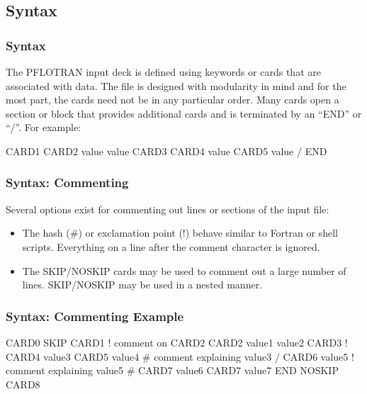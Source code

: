 \subsection{Syntax}

\begin{frame}\frametitle{Syntax}

The PFLOTRAN input deck is defined using keywords or cards that are associated with data.  The file is designed with modularity in mind and for the most part, the cards need not be in any particular order.  Many cards open a section or block that provides additional cards and is terminated by an ``END'' or ``/''.  For example:

\begin{semiverbatim}
CARD1
  CARD2 value value
  CARD3
    CARD4 value
    CARD5 value
  /
END
\end{semiverbatim}

\end{frame}

\begin{frame}[fragile]\frametitle{Syntax: Commenting}
Several options exist for commenting out lines or sections of the input file:
\begin{itemize}
\item The hash (\#) or exclamation point (!) behave similar to Fortran or shell scripts.  Everything on a line after the comment character is ignored.
\item The SKIP/NOSKIP cards may be used to comment out a large number of lines.  SKIP/NOSKIP may be used in a nested manner.
\end{itemize}

\end{frame}

\begin{frame}[containsverbatim]\frametitle{Syntax: Commenting Example}

\begin{semiverbatim}
CARD0
SKIP
CARD1
  ! comment on CARD2
  CARD2 value1 value2
  CARD3
  !  CARD4 value3
    CARD5 value4 # comment explaining value3
  /
  CARD6 value5 ! comment explaining value5
#  CARD7 value6
  CARD7 value7
END
NOSKIP
CARD8
\end{semiverbatim}

\end{frame}
